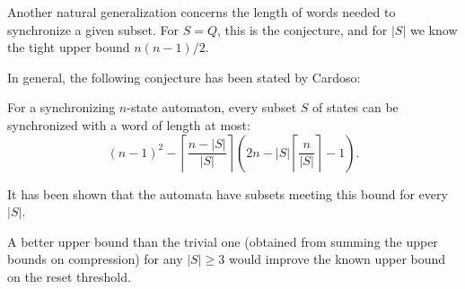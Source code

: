 Another natural generalization concerns the length of words needed to synchronize a given subset. For $S=Q$, this is the \Cerny conjecture, and for $|S|$ we know the tight upper bound $n(n-1)/2$.

In general, the following conjecture has been stated by Cardoso:
\begin{conjecture}
For a synchronizing $n$-state automaton, every subset $S$ of states can be synchronized with a word of length at most:
\[ (n-1)^2 - \left\lceil\frac{n-|S|}{|S|}\right\rceil (2n - |S| \left\lceil\frac{n}{|S|}\right\rceil - 1) .\]
\end{conjecture}
It has been shown that the \Cerny automata have subsets meeting this bound for every $|S|$.

A better upper bound than the trivial one (obtained from summing the upper bounds on compression) for any $|S| \ge 3$ would improve the known upper bound on the reset threshold.
